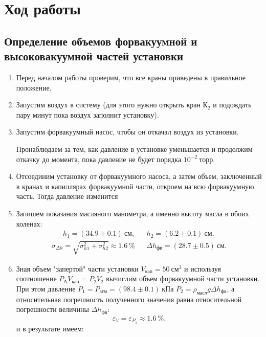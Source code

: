 \documentclass[a4paper,12pt]{article}
\theoremstyle{definition}
\begin{document}
	\section{Ход работы}
	
	\subsection{Определение объемов форвакуумной и высоковакуумной частей установки}
	
	\begin{enumerate}
	
	\item Перед началом работы проверим, что все краны приведены в правильное положение. 
	
	\item Запустим воздух в систему (для этого нужно открыть кран $К_2$  и подождать пару минут пока воздух заполнит установку). 
	
	\item Запустим форвакуумный насос, чтобы он откачал воздух из установки. 
	
	Пронаблюдаем за тем, как давление в установке уменьшается и продолжим откачку до момента, пока давление не будет порядка $ 10^{-2}~торр$.
	
	\item Отсоединим установку от форвакуумного насоса, а затем объем, заключенный в кранах и капиллярах форвакуумной части, откроем на всю форвакуумную часть. Тогда давление изменится
	
	\item Запишем показания масляного манометра, а именно высоту масла в обоих коленах: 
	\begin{align}
		h_1 = (34.9 \pm 0.1) ~см, && h_2 = (6.2 \pm 0.1) ~см,
	\end{align}
	\begin{align}
		\sigma_{\Delta h} = \sqrt{\sigma_{h1}^2 + \sigma_{h2}^2}\approx 1.6~\% & &
		\Delta h_{фв} = (28.7 \pm 0.5) ~см.
	\end{align}

	\item Зная объем "запертой"  части установки $V_{кап} = 50 ~см^3$ и используя соотношение $P_\text{А} V_{кап}=P_2 V_2$ вычислим объем форвакуумной части установки. При этом давление $P_1 = P_{атм} = (98.4 \pm 0.1) ~кПа$ $P_2 =   \rho_{масл} g \Delta h_{фв}$, а относительная погрешность полученного значения равна относительной погрешности величины $\Delta h_{фв} $:
	$$\varepsilon_V = \varepsilon_{P_1} \approx 1.6 ~\%.$$ и в результате имеем: 
	

\end{enumerate}
\end{document}
